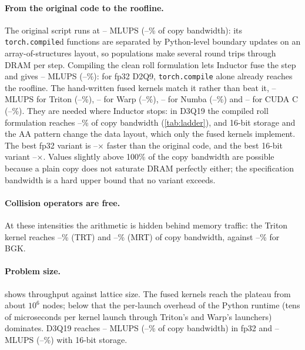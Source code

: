 \documentclass[11pt]{article}
\providecommand{\origMLUPS}{--}\providecommand{\origPct}{--}
\providecommand{\speedupFpThirtyTwo}{--}\providecommand{\speedupBest}{--}
\providecommand{\bestThreeDMLUPS}{--}\providecommand{\bestThreeDName}{--}
\providecommand{\bestThreeDPct}{--}\providecommand{\bestThreeDSixteenMLUPS}{--}
\providecommand{\bestThreeDSixteenPct}{--}
\providecommand{\tritonTRTPct}{--}\providecommand{\tritonMRTPct}{--}
\providecommand{\compileRollMLUPS}{--}\providecommand{\compileRollPct}{--}
\providecommand{\compileRollThreeDPct}{--}
\providecommand{\tritonFusedPct}{--}\providecommand{\warpFusedPct}{--}
\providecommand{\numbaFusedPct}{--}\providecommand{\cudaFusedPct}{--}
\providecommand{\tritonFusedMLUPS}{--}\providecommand{\warpFusedMLUPS}{--}
\providecommand{\numbaFusedMLUPS}{--}\providecommand{\cudaFusedMLUPS}{--}
\begin{document}
\paragraph{From the original code to the roofline.}
The original script runs at \origMLUPS{} MLUPS (\origPct\% of copy bandwidth): its
\texttt{torch.compile}d functions are separated by Python-level boundary updates on an
array-of-structures layout, so populations make several round trips through DRAM per step.
Compiling the clean roll formulation lets Inductor fuse the step and gives
\compileRollMLUPS{} MLUPS (\compileRollPct\%): for fp32 D2Q9, \texttt{torch.compile} alone
already reaches the roofline. The hand-written fused kernels match it rather than beat it,
\tritonFusedMLUPS{} MLUPS for Triton (\tritonFusedPct\%), \warpFusedMLUPS{} for
Warp (\warpFusedPct\%), \numbaFusedMLUPS{} for Numba (\numbaFusedPct\%) and
\cudaFusedMLUPS{} for CUDA C (\cudaFusedPct\%). They are needed where Inductor stops: in
D3Q19 the compiled roll formulation reaches \compileRollThreeDPct\% of copy bandwidth
(\cref{tab:ladder}), and 16-bit storage and the AA pattern change the data layout, which only
the fused kernels implement. The best fp32 variant is
\speedupFpThirtyTwo$\times$ faster than the original code, and the best 16-bit variant
\speedupBest$\times$. Values slightly above 100\% of the copy bandwidth are possible because
a plain copy does not saturate DRAM perfectly either; the specification bandwidth is a hard
upper bound that no variant exceeds.

\paragraph{Collision operators are free.} At these intensities the arithmetic is hidden
behind memory traffic: the Triton kernel reaches \tritonTRTPct\% (TRT) and \tritonMRTPct\%
(MRT) of copy bandwidth, against \tritonFusedPct\% for BGK.

\paragraph{Problem size.}  shows throughput against lattice size. The
fused kernels reach the plateau from about $10^6$ nodes; below that the per-launch overhead
of the Python runtime (tens of microseconds per kernel launch through Triton's and Warp's
launchers) dominates. D3Q19 reaches \bestThreeDMLUPS{} MLUPS (\bestThreeDPct\% of copy
bandwidth) in fp32 and \bestThreeDSixteenMLUPS{} MLUPS (\bestThreeDSixteenPct\%) with
16-bit storage.
\end{document}
